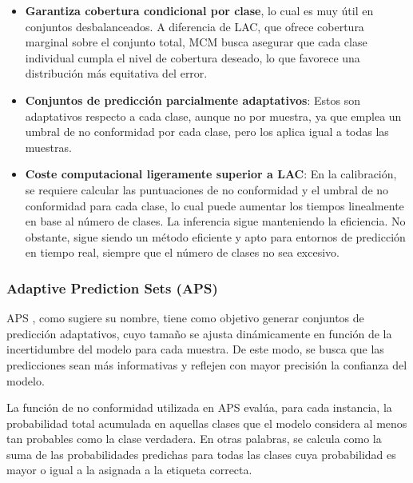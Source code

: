 \begin{itemize}

    \item \textbf{Garantiza cobertura condicional por clase}, lo cual es muy útil en conjuntos desbalanceados. A diferencia de LAC, que ofrece cobertura marginal sobre el conjunto total, MCM busca asegurar que cada clase individual cumpla el nivel de cobertura deseado, lo que favorece una distribución más equitativa del error.
    
    \item \textbf{Conjuntos de predicción parcialmente adaptativos}: Estos son adaptativos respecto a cada clase, aunque no por muestra, ya que emplea un umbral de no conformidad por cada clase, pero los aplica igual a todas las muestras.  

    \item \textbf{Coste computacional ligeramente superior a LAC}: En la calibración, se requiere calcular las puntuaciones de no conformidad y el umbral de no conformidad para cada clase, lo cual puede aumentar los tiempos linealmente en base al número de clases. La inferencia sigue manteniendo la eficiencia. No obstante, sigue siendo un método eficiente y apto para entornos de predicción en tiempo real, siempre que el número de clases no sea excesivo.

\end{itemize}


\subsubsection{Adaptive Prediction Sets (APS)}

APS \cite{romano2020}, como sugiere su nombre, tiene como objetivo generar conjuntos de predicción adaptativos, cuyo tamaño se ajusta dinámicamente en función de la incertidumbre del modelo para cada muestra. De este modo, se busca que las predicciones sean más informativas y reflejen con mayor precisión la confianza del modelo.

La función de no conformidad utilizada en APS evalúa, para cada instancia, la probabilidad total acumulada en aquellas clases que el modelo considera al menos tan probables como la clase verdadera. En otras palabras, se calcula como la suma de las probabilidades predichas para todas las clases cuya probabilidad es mayor o igual a la asignada a la etiqueta correcta.

